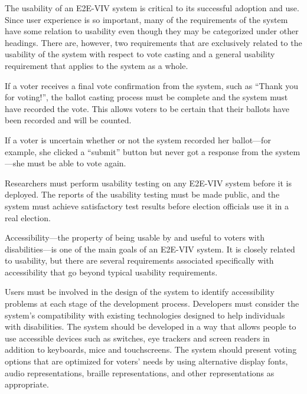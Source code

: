 
The usability of an E2E-VIV system is critical to its successful
adoption and use. Since user experience is so important, many of the
requirements of the system have some relation to usability even though
they may be categorized under other headings. There are, however, two
requirements that are exclusively related to the usability of the
system with respect to vote casting and a general usability
requirement that applies to the system as a whole.

If a voter receives a final vote confirmation from the system, such as
``Thank you for voting!'', the ballot casting process must be complete
and the system must have recorded the vote. This allows voters to be
certain that their ballots have been recorded and will be counted.

If a voter is uncertain whether or not the system recorded her
ballot---for example, she clicked a ``submit'' button but never got a
response from the system---she must be able to vote again.

Researchers must perform usability testing on any E2E-VIV system
before it is deployed. The reports of the usability testing must be
made public, and the system must achieve satisfactory test results
before election officials use it in a real election.


Accessibility---the property of being usable by and useful to voters
with disabilities---is one of the main goals of an E2E-VIV system. It
is closely related to usability, but there are several requirements
associated specifically with accessibility that go beyond typical
usability requirements.

Users must be involved in the design of the system to identify
accessibility problems at each stage of the development
process. Developers must consider the system's compatibility with
existing technologies designed to help individuals with disabilities.
The system should be developed in a way that allows people to use
accessible devices such as switches, eye trackers and screen readers
in addition to keyboards, mice and touchscreens. The system should
present voting options that are optimized for voters' needs by using
alternative display fonts, audio representations, braille
representations, and other representations as appropriate.


